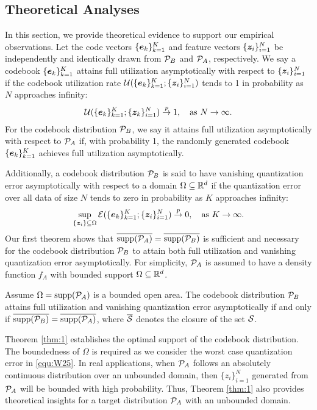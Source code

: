 \subsection{Theoretical Analyses} \label{sec:theoretical analysis}

In this section, we provide theoretical evidence to support our empirical observations. 
Let the code vectors $\{\bm{e}_k\}_{k=1}^K$ and  feature vectors $\{\bm{z}_i\}_{i=1}^N$ be independently and identically drawn from $\mathcal{P}_B$ and $\mathcal{P}_A$, respectively.
We say a codebook $\{\bm{e}_k\}_{k=1}^K$ attains full utilization asymptotically with respect to  $\{\bm{z}_i\}_{i=1}^N$ if the codebook utilization rate $\mathcal{U}(\{\bm{e}_k\}_{k=1}^K;\{\bm{z}_i\}_{i=1}^N)$ tends to 1 in probability as $N$ approaches infinity:
\begin{align}
\mathcal{U}(\{\bm{e}_k\}_{k=1}^K;\{\bm{z}_k\}_{i=1}^N)\overset{p}{\to}1,\quad \textnormal{as }N\to\infty.
\end{align}
For the codebook distribution $\mathcal{P}_B$, we say it attains full utilization asymptotically with respect to $\mathcal{P}_A$ if, with probability 1, the randomly generated codebook $\{\bm{e}_k\}_{k=1}^K$ achieves full utilization asymptotically. 


Additionally, a codebook distribution $\mathcal{P}_B$ is said to have vanishing quantization error asymptotically with respect to a domain $\Omega\subseteq\mathbb{R}^d$ if the quantization error over all data of size $N$  tends to zero in probability as $K$ approaches infinity:
\begin{align}\label{equ:W25}
\sup_{\{\bm{z}_i\}\subseteq\Omega}\mathcal{E}(\{\bm{e}_k\}_{k=1}^K;\{\bm{z}_i\}_{i=1}^N)\overset{p}{\to}0,\quad \textnormal{as }K\to\infty.
\end{align}
Our first theorem shows that $\overline{\mathrm{supp}(\mathcal{P}_A)}=\overline{\mathrm{supp}(\mathcal{P}_B)}$ is sufficient and necessary  for the codebook distribution $\mathcal{P}_B$ to attain both full utilization and vanishing quantization error asymptotically. For simplicity, $\mathcal{P}_A$ is assumed to have a density function $f_A$ with bounded support $\Omega\subseteq\mathbb{R}^d$. 

\begin{theorem}\label{thm:1}
    Assume $\Omega=\mathrm{supp}(\mathcal{P}_A)$ is a bounded open area. The codebook distribution $\mathcal{P}_B$ attains full utilization and vanishing quantization error asymptotically if and only if $\overline{\mathrm{supp}(\mathcal{P}_B)}=\overline{\mathrm{supp}(\mathcal{P}_A)}$, where $\overline{{\mathcal{S}}}$ denotes the closure of the set ${\mathcal{S}}$.
\vspace{-1ex}
\end{theorem}
Theorem \ref{thm:1} establishes the optimal support of the codebook distribution. The boundedness of $\Omega$ is required as we consider the worst case quantization error in \eqref{equ:W25}. In real applications, when $\mathcal{P}_A$ follows an absolutely continuous distribution over an unbounded domain, then $\{z_i\}_{i=1}^N$ generated from $\mathcal{P}_A$ will be bounded with high probability. Thus, Theorem \ref{thm:1} also provides theoretical insights for a target distribution $\mathcal{P}_A$ with an unbounded domain.


